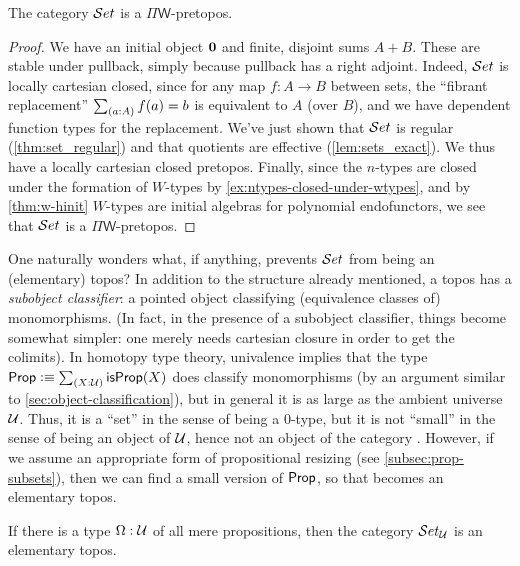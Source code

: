\begin{thm}
  The category $\mathcal{S}et$ is a $\Pi\mathsf{W}$-pretopos.
\end{thm}
\begin{proof}
  We have an initial object
  $\mathbf{0}$ and finite, disjoint sums $A+B$.  These are stable under pullback, simply because pullback has a right adjoint.  Indeed, $\mathcal{S}et$ is locally cartesian closed, since for any map $f:A\to B$ between sets, the ``fibrant replacement''  $\sm{a:A}f(a)=b$ is equivalent to $A$ (over $B$), and we have dependent function types for the replacement.
We've just shown that $\mathcal{S}et$ is regular (\autoref{thm:set_regular}) and that quotients are effective (\autoref{lem:sets_exact}). We thus have a locally cartesian closed pretopos. Finally, since the $n$-types are closed under the formation of $W$-types by \autoref{ex:ntypes-closed-under-wtypes}, and by \autoref{thm:w-hinit} $W$-types are initial algebras for polynomial endofunctors, we see that $\mathcal{S}et$ is a $\Pi\mathsf{W}$-pretopos.
\end{proof}


One naturally wonders what, if anything, prevents $\mathcal{S}et$ from being an (elementary) topos?
In addition to the structure already mentioned, a topos has a
\emph{subobject classifier}:
%
%
%
a pointed object classifying (equivalence classes of) monomorphisms.  (In fact, in the presence of a subobject
classifier, things become somewhat simpler: one merely needs cartesian closure in order to get the colimits).
In homotopy type theory, univalence implies that the type $\prop \defeq \sm{X:\UU}\isprop(X)$ does classify monomorphisms (by an argument similar to \autoref{sec:object-classification}), but in general it is as large as the ambient universe $\mathcal{U}$.
Thus, it is a ``set'' in the sense of being a $0$-type, but it is not ``small'' in the sense of being an object of $\mathcal{U}$, hence not an object of the category \uset.
However, if we assume an appropriate form of propositional resizing (see \autoref{subsec:prop-subsets}), then we can find a small version of $\mathsf{Prop}$, so that \uset becomes an elementary topos.

\begin{thm}\label{thm:settopos}
  If there is a type $\Omega:\mathcal{U}$ of all mere propositions, then the category $\mathcal{S}et_\mathcal{U}$ is an elementary topos.
\end{thm}

